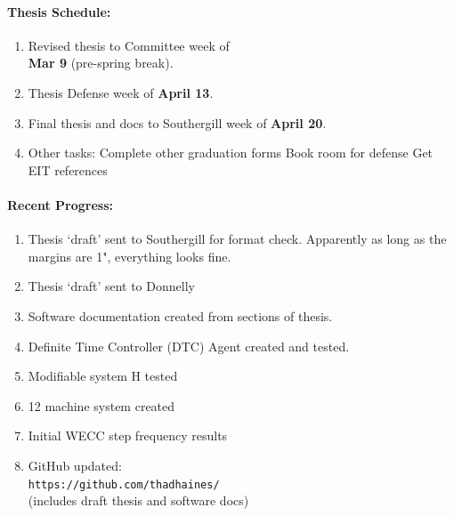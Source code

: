 \documentclass[12pt]{article}
\begin{document}
\begin{multicols}{2}
\raggedright
	\paragraph{Thesis Schedule:}
	\begin{enumerate}
\itemsep0em 
		\item Revised thesis to Committee week of \\ \textbf{Mar 9} (pre-spring break).
		\item Thesis Defense week of \textbf{April 13}.
		\item Final thesis and docs to Southergill week of \textbf{April 20}.
\item Other tasks:
\subitem Complete other graduation forms
\subitem Book room for defense
\subitem Get EIT references
\end{enumerate}

	\paragraph{Recent Progress:}
	\begin{enumerate}
\itemsep0em 
\item Thesis `draft' sent to Southergill for format check. Apparently as long as the margins are 1", everything looks fine.
\item Thesis `draft' sent to Donnelly
\item Software documentation created from sections of thesis.
\item Definite Time Controller (DTC) Agent created and tested.
\item Modifiable system H tested
\item 12 machine system created
\item Initial WECC step frequency results

		\item GitHub updated:\\
		\verb|https://github.com/thadhaines/ |\\
(includes draft thesis and software docs)

\vfill\null
\columnbreak
	
	\end{enumerate}

\end{multicols}
\end{document}
